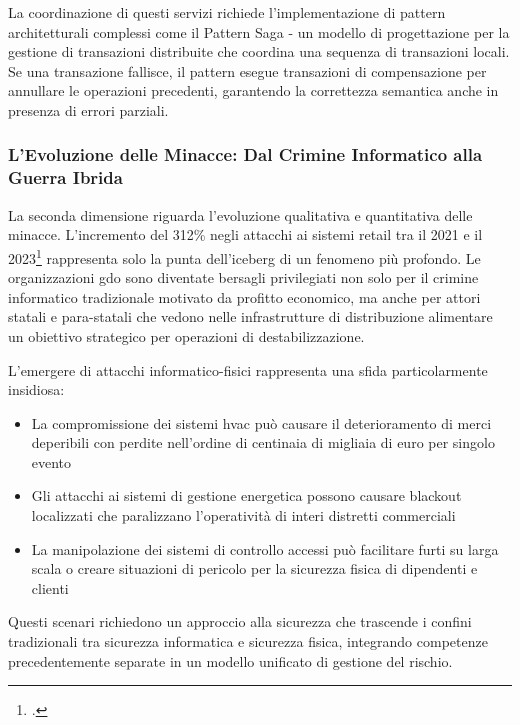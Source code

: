 La coordinazione di questi servizi richiede l'implementazione di pattern architetturali complessi come il Pattern Saga - un modello di progettazione per la gestione di transazioni distribuite che coordina una sequenza di transazioni locali. Se una transazione fallisce, il pattern esegue transazioni di compensazione per annullare le operazioni precedenti, garantendo la correttezza semantica anche in presenza di errori parziali.

\subsubsection{\texorpdfstring{L'Evoluzione delle Minacce: Dal Crimine Informatico alla Guerra Ibrida}{1.1.2.2 - L'Evoluzione delle Minacce: Dal Crimine Informatico alla Guerra Ibrida}}
\label{subsubsec:evoluzione_minacce}

La seconda dimensione riguarda l'evoluzione qualitativa e quantitativa delle minacce. L'incremento del 312\% negli attacchi ai sistemi retail tra il 2021 e il 2023\footcite{enisa2024retail} rappresenta solo la punta dell'iceberg di un fenomeno più profondo. Le organizzazioni \gls{gdo} sono diventate bersagli privilegiati non solo per il crimine informatico tradizionale motivato da profitto economico, ma anche per attori statali e para-statali che vedono nelle infrastrutture di distribuzione alimentare un obiettivo strategico per operazioni di destabilizzazione.

L'emergere di attacchi informatico-fisici rappresenta una sfida particolarmente insidiosa:
\begin{itemize}
\item La compromissione dei sistemi \gls{hvac} può causare il deterioramento di merci deperibili con perdite nell'ordine di centinaia di migliaia di euro per singolo evento
\item Gli attacchi ai sistemi di gestione energetica possono causare blackout localizzati che paralizzano l'operatività di interi distretti commerciali
\item La manipolazione dei sistemi di controllo accessi può facilitare furti su larga scala o creare situazioni di pericolo per la sicurezza fisica di dipendenti e clienti
\end{itemize}

Questi scenari richiedono un approccio alla sicurezza che trascende i confini tradizionali tra sicurezza informatica e sicurezza fisica, integrando competenze precedentemente separate in un modello unificato di gestione del rischio.

